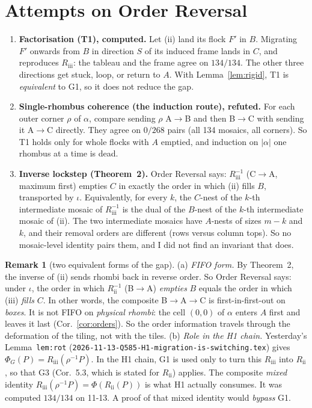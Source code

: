 \documentclass[11pt]{article}
\theoremstyle{definition}
\newtheorem{remark}[theorem]{Remark}
\newcommand{\Rii}{R_{\mathrm{ii}}}
\newcommand{\Riii}{R_{\mathrm{iii}}}
\begin{document}
\section{Attempts on Order Reversal}
\begin{enumerate}
\item \textbf{Factorisation (T1), computed.} Let (ii) land its flock $F'$ in $B$. Migrating $F'$ onwards from $B$ in direction $S$
of its induced frame lands in $C$, and reproduces $\Riii$: the tableau and the frame agree on $134/134$. The other three directions
get stuck, loop, or return to $A$. With Lemma~\ref{lem:rigid}, T1 is \emph{equivalent} to G1, so it does not reduce the gap.
\item \textbf{Single-rhombus coherence (the induction route), refuted.} For each outer corner $\rho$ of $\alpha$, compare sending
$\rho$ A$\to$B and then B$\to$C with sending it A$\to$C directly. They agree on $0/268$ pairs (all 134 mosaics, all corners). So T1
holds only for whole flocks with $A$ emptied, and induction on $|\alpha|$ one rhombus at a time is dead.
\item \textbf{Inverse lockstep (Theorem~2).} Order Reversal says: $\Riii^{-1}$ (C$\to$A, maximum first) empties $C$ in exactly the
order in which (ii) fills $B$, transported by $\iota$. Equivalently, for every $k$, the $C$-nest of the $k$-th intermediate mosaic of
$\Riii^{-1}$ is the dual of the $B$-nest of the $k$-th intermediate mosaic of (ii). The two intermediate mosaics have $A$-nests of
sizes $m-k$ and $k$, and their removal orders are different (rows versus column tops). So no mosaic-level identity pairs them, and
I did not find an invariant that does.
\end{enumerate}

\begin{remark}[two equivalent forms of the gap]
(a) \emph{FIFO form.} By Theorem~2, the inverse of (ii) sends rhombi back in reverse order. So Order Reversal says: under
$\iota$, the order in which $\Rii^{-1}$ (B$\to$A) \emph{empties} $B$ equals the order in which (iii) \emph{fills} $C$. In other
words, the composite B$\to$A$\to$C is first-in-first-out on \emph{boxes}. It is not FIFO on \emph{physical rhombi}: the cell
$(0,0)$ of $\alpha$ enters $A$ first and leaves it last (Cor.~\ref{cor:orders}). So the order information travels through the
deformation of the tiling, not with the tiles.
(b) \emph{Role in the H1 chain.} Yesterday's Lemma~\texttt{lem:rot} (\texttt{2026-11-13-Q585-H1-migration-is-switching.tex})
gives $\Phi_G(P)=\Riii(\rho^{-1}P)$. In the H1 chain, G1 is used only to turn this $\Riii$ into $\Rii$, so that G3 (Cor.~5.3,
which is stated for $\Rii$) applies. The composite \emph{mixed} identity $\Riii(\rho^{-1}P)=\Phi(\Rii(P))$ is what H1 actually
consumes. It was computed $134/134$ on 11-13. A proof of that mixed identity would \emph{bypass} G1.
\end{remark}
\end{document}
